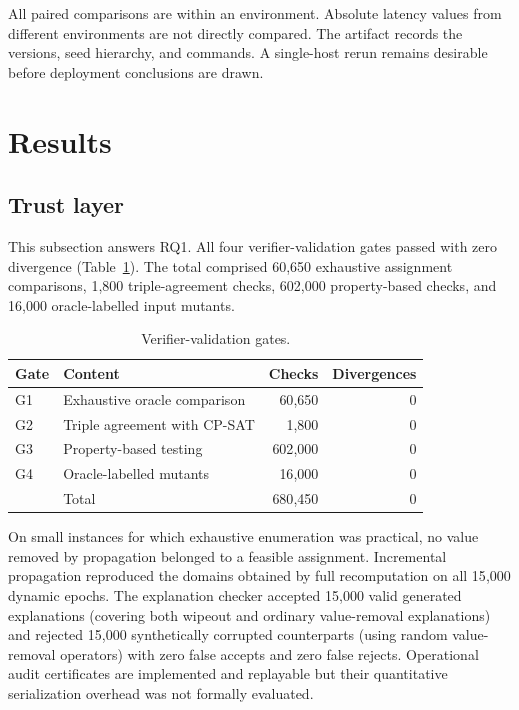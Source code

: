 \documentclass[pdflatex,sn-mathphys-num,iicol,oneside]{sn-jnl}
\newcommand{\cpsat}{\textsc{CP-SAT}\xspace}
\begin{document}
All paired comparisons are within an environment. Absolute latency
values from different environments are not directly compared. The
artifact records the versions, seed hierarchy, and commands. A
single-host rerun remains desirable before deployment conclusions are
drawn.

\section{Results}
\label{sec:results}

\subsection{Trust layer}
\label{sec:results-trust}

This subsection answers RQ1. All four verifier-validation gates passed with zero divergence
(Table~\ref{tab:gates}). The total comprised 60{,}650 exhaustive
assignment comparisons, 1{,}800 triple-agreement checks, 602{,}000
property-based checks, and 16{,}000 oracle-labelled input mutants.

\begin{table}[t]
\centering
\caption{Verifier-validation gates.}
\label{tab:gates}
\setlength{\tabcolsep}{4pt}
\small

\begin{tabular}{llrr}
\toprule
Gate & Content & Checks & Divergences\\
\midrule
G1 & Exhaustive oracle comparison & 60{,}650 & 0\\
G2 & Triple agreement with \cpsat & 1{,}800 & 0\\
G3 & Property-based testing & 602{,}000 & 0\\
G4 & Oracle-labelled mutants & 16{,}000 & 0\\
\midrule
& Total & 680{,}450 & 0\\
\bottomrule
\end{tabular}
\end{table}

On small instances for which exhaustive enumeration was practical, no
value removed by propagation belonged to a feasible assignment.
Incremental propagation reproduced the domains obtained by full
recomputation on all 15{,}000 dynamic epochs. The explanation checker
accepted 15{,}000 valid generated explanations (covering both wipeout and ordinary value-removal explanations) and rejected 15{,}000 synthetically corrupted counterparts (using random value-removal operators) with zero false accepts and zero false rejects. Operational audit certificates are implemented and replayable but their quantitative serialization overhead was not formally evaluated.
\end{document}
